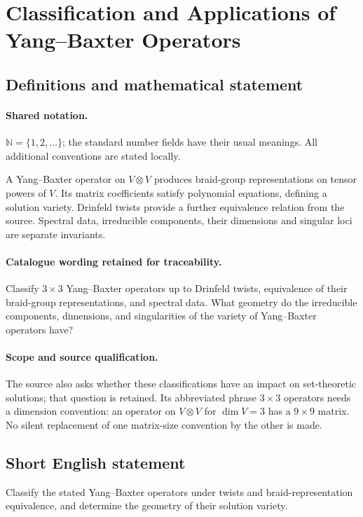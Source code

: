\documentclass[11pt]{article}
\begin{document}
\section{Classification and Applications of Yang–Baxter Operators}\label{statement}

\subsection{Definitions and mathematical statement}

\paragraph{Shared notation.}$\mathbb N=\{1,2,\ldots\}$; the standard number fields have their usual meanings. All additional conventions are stated locally.


A Yang--Baxter operator on $V\otimes V$ produces braid-group representations on tensor powers of $V$. Its matrix coefficients satisfy polynomial equations, defining a solution variety. Drinfeld twists provide a further equivalence relation from the source. Spectral data, irreducible components, their dimensions and singular loci are separate invariants.

\paragraph{Catalogue wording retained for traceability.}
Classify $3\times3$ Yang–Baxter operators up to Drinfeld twists, equivalence of their braid-group representations, and spectral data. What geometry do the irreducible components, dimensions, and singularities of the variety of Yang–Baxter operators have?

\paragraph{Scope and source qualification.}The source also asks whether these classifications have an impact on set-theoretic solutions; that question is retained. Its abbreviated phrase $3\times3$ operators needs a dimension convention: an operator on $V\otimes V$ for $\dim V=3$ has a $9\times9$ matrix. No silent replacement of one matrix-size convention by the other is made.
\subsection{Short English statement}
Classify the stated Yang--Baxter operators under twists and braid-representation equivalence, and determine the geometry of their solution variety.
\end{document}
